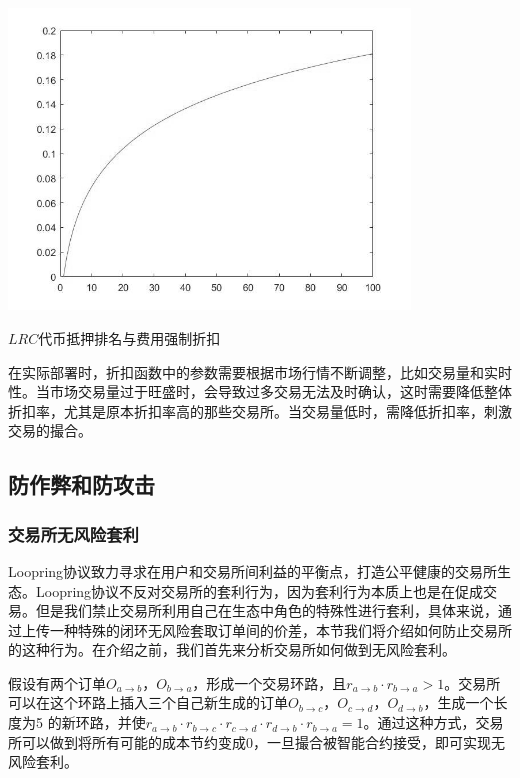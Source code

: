 \documentclass[UTF8,nofonts]{ctexart}
\makeatletter
\newenvironment{figurehere}
  {\def\@captype{figure}}
  {}
\makeatother
\begin{document}
\begin{center}
\begin{figurehere}
\includegraphics[height=8cm]{images/exchange-discount.png}

\caption{$LRC$代币抵押排名与费用强制折扣}
\label{fig:discount}

\end{figurehere}
\end{center}

在实际部署时，折扣函数中的参数需要根据市场行情不断调整，比如交易量和实时性。当市场交易量过于旺盛时，会导致过多交易无法及时确认，这时需要降低整体折扣率，尤其是原本折扣率高的那些交易所。当交易量低时，需降低折扣率，刺激交易的撮合。

\subsection{防作弊和防攻击}

\subsubsection{交易所无风险套利}
Loopring协议致力寻求在用户和交易所间利益的平衡点，打造公平健康的交易所生态。Loopring协议不反对交易所的套利行为，因为套利行为本质上也是在促成交易。但是我们禁止交易所利用自己在生态中角色的特殊性进行套利，具体来说，通过上传一种特殊的闭环无风险套取订单间的价差，本节我们将介绍如何防止交易所的这种行为。在介绍之前，我们首先来分析交易所如何做到无风险套利。

假设有两个订单$O_{a\rightarrow b}$，$O_{b\rightarrow a}$，形成一个交易环路，且$r_{a\rightarrow b} \cdot r_{b\rightarrow a} > 1$。交易所可以在这个环路上插入三个自己新生成的订单$O_{b\rightarrow c}$，$O_{c\rightarrow d}$，$O_{d\rightarrow b}$，生成一个长度为5
的新环路，并使$r_{a\rightarrow b}  \cdot r_{b\rightarrow c} \cdot r_{c\rightarrow d}\cdot r_{d\rightarrow b}\cdot r_{b\rightarrow a}  = 1$。通过这种方式，交易所可以做到将所有可能的成本节约变成0，一旦撮合被智能合约接受，即可实现无风险套利。
\end{document}
